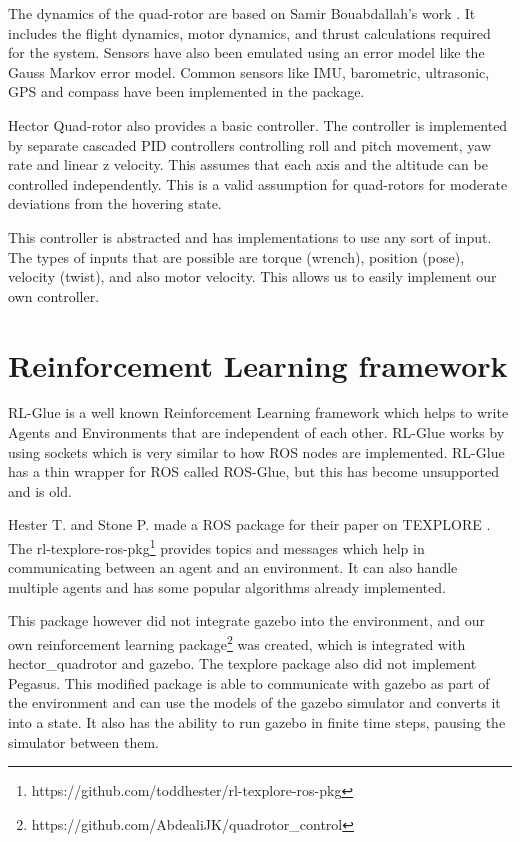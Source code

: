 \documentclass[hidelinks,BTech]{iitmdiss}
\begin{document}
The dynamics of the quad-rotor are based on Samir Bouabdallah's work \cite{QuadrotorDynamics}. It includes the flight dynamics, motor dynamics, and thrust calculations required for the system. Sensors have also been emulated using an error model like the Gauss Markov error model. Common sensors like IMU, barometric, ultrasonic, GPS and compass have been implemented in the package.

Hector Quad-rotor also provides a basic controller. The controller is implemented by separate cascaded PID controllers controlling roll and pitch movement, yaw rate and linear z velocity. This assumes that each axis and the altitude can be controlled independently. This is a valid assumption for quad-rotors for moderate deviations from the hovering state.

This controller is abstracted and has implementations to use any sort of input. The types of inputs that are possible are torque (wrench), position (pose), velocity (twist), and also motor velocity. This allows us to easily implement our own controller.

\section{Reinforcement Learning framework}

RL-Glue \cite{RLGlue} is a well known Reinforcement Learning framework which helps to write Agents and Environments that are independent of each other. RL-Glue works by using sockets which is very similar to how ROS nodes are implemented. RL-Glue has a thin wrapper for ROS called ROS-Glue, but this has become unsupported and is old.

Hester T. and Stone P. made a ROS package for their paper on TEXPLORE \cite{Texplore}. The rl-texplore-ros-pkg\footnote{https://github.com/toddhester/rl-texplore-ros-pkg} provides topics and messages which help in communicating between an agent and an environment. It can also handle multiple agents and has some popular algorithms already implemented.

This package however did not integrate gazebo into the environment, and our own reinforcement learning package\footnote{https://github.com/AbdealiJK/quadrotor\_control} was created, which is integrated with hector\_quadrotor and gazebo. The texplore package also did not implement Pegasus. This modified package is able to communicate with gazebo as part of the environment and can use the models of the gazebo simulator and converts it into a state. It also has the ability to run gazebo in finite time steps, pausing the simulator between them.
\end{document}

